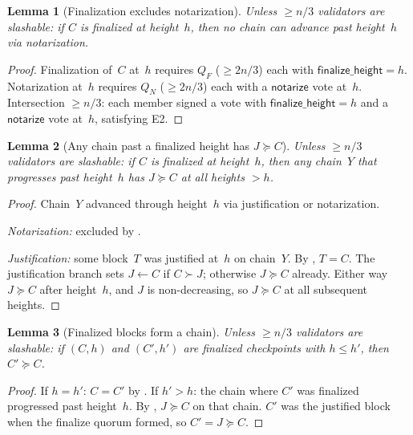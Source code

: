 \ifx\litemode\undefined\documentclass{article}\fi
\newcommand{\notarize}{\mathsf{notarize}}
\theoremstyle{plain}
\newtheorem{lemma}{Lemma}
\theoremstyle{definition}
\theoremstyle{remark}
\begin{document}
\begin{lemma}[Finalization excludes notarization]\label{lem:finexclude-notarize}
Unless $\geq n/3$ validators are slashable: if $C$ is finalized at height~$h$, then no chain can advance past height~$h$ via notarization.
\end{lemma}

\begin{proof}
Finalization of~$C$ at~$h$ requires $Q_F$ ($\geq 2n/3$) each with $\mathsf{finalize\_height} = h$.
Notarization at~$h$ requires $Q_N$ ($\geq 2n/3$) each with a $\notarize$ vote at~$h$.
Intersection $\geq n/3$: each member signed a vote with $\mathsf{finalize\_height} = h$ and a $\notarize$ vote at~$h$, satisfying E2.
\end{proof}

\begin{lemma}[Any chain past a finalized height has $J \succeq C$]\label{lem:mainsafety}
Unless $\geq n/3$ validators are slashable: if $C$ is finalized at height~$h$, then any chain~$Y$ that progresses past height~$h$ has $J \succeq C$ at all heights $> h$.
\end{lemma}

\begin{proof}
Chain~$Y$ advanced through height~$h$ via justification or notarization.

\emph{Notarization:} excluded by .

\emph{Justification:} some block~$T$ was justified at~$h$ on chain~$Y$.
By , $T = C$.
The justification branch sets $J \gets C$ if $C \succ J$; otherwise $J \succeq C$ already.
Either way $J \succeq C$ after height~$h$, and $J$ is non-decreasing, so $J \succeq C$ at all subsequent heights.
\end{proof}

\begin{lemma}[Finalized blocks form a chain]\label{lem:finchain}
Unless $\geq n/3$ validators are slashable: if $(C, h)$ and $(C', h')$ are finalized checkpoints with $h \leq h'$, then $C' \succeq C$.
\end{lemma}

\begin{proof}
If $h = h'$: $C = C'$ by .
If $h' > h$: the chain where $C'$ was finalized progressed past height~$h$.
By , $J \succeq C$ on that chain.
$C'$ was the justified block when the finalize quorum formed, so $C' = J \succeq C$.
\end{proof}
\end{document}
